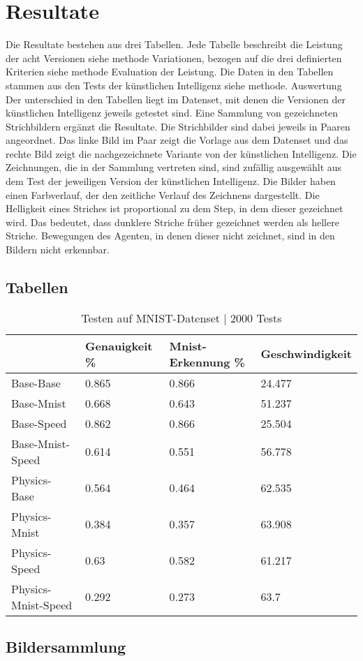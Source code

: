 \chapter{Resultate}
Die Resultate bestehen aus drei Tabellen. Jede Tabelle beschreibt die Leistung
der acht Versionen {siehe methode Variationen}, bezogen auf die drei definierten
Kriterien {siehe methode Evaluation der Leistung}. Die Daten in den Tabellen
stammen aus den Tests der künstlichen Intelligenz {siehe methode. Auswertung}
Der unterschied in den Tabellen liegt im Datenset, mit denen die Versionen der
künstlichen Intelligenz jeweils getestet sind. 
Eine Sammlung von gezeichneten Strichbildern ergänzt die Resultate. Die
Strichbilder sind dabei jeweils in Paaren angeordnet. Das linke Bild im Paar
zeigt die Vorlage aus dem Datenset und das rechte Bild zeigt die nachgezeichnete
Variante von der künstlichen Intelligenz. Die Zeichnungen, die in der Sammlung
vertreten sind, sind zufällig ausgewählt aus dem Test der jeweiligen Version der
künstlichen Intelligenz. Die Bilder haben einen Farbverlauf, der den zeitliche
Verlauf des Zeichnens dargestellt. Die Helligkeit eines Striches ist
proportional zu dem Step, in dem dieser gezeichnet wird. Das bedeutet, dass
dunklere Striche früher gezeichnet werden als hellere Striche. Bewegungen des
Agenten, in denen dieser nicht zeichnet, sind in den Bildern nicht erkennbar.

\newpage
\section{Tabellen}
\begin{table}[!ht]
    \centering
    \caption{Testen auf MNIST-Datenset | 2000 Tests}
    \begin{tabular}{|l|l|l|l|}
        \hline
            ~ & Genauigkeit \% & Mnist-Erkennung \% & Geschwindigkeit \\ \hline
            Base-Base & 0.865 & 0.866 & 24.477 \\ \hline
            Base-Mnist & 0.668 & 0.643 & 51.237 \\ \hline
            Base-Speed & 0.862 & 0.866 & 25.504 \\ \hline
            Base-Mnist-Speed & 0.614 & 0.551 & 56.778 \\ \hline
            Physics-Base & 0.564 & 0.464 & 62.535 \\ \hline
            Physics-Mnist & 0.384 & 0.357 & 63.908 \\ \hline
            Physics-Speed & 0.63 & 0.582 & 61.217 \\ \hline
            Physics-Mnist-Speed & 0.292 & 0.273 & 63.7 \\ \hline
        \end{tabular}
    \label{tab:MNIST}
\end{table}


\section{Bildersammlung}
